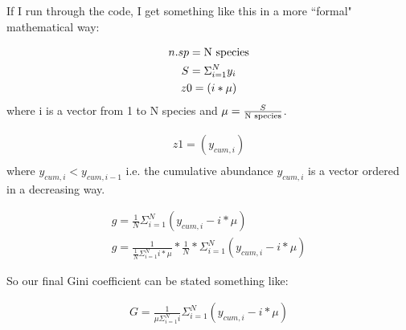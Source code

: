 \documentclass{article}
\begin{document}
If I run through the code, I get something like this in a more ``formal" mathematical way:

\begin{gather}
n.sp = \textnormal{N species} \\
S = \Sigma_{i=1}^Ny_i \\
z0 = (i * \mu )
\end{gather}
where i is a vector from 1 to N species and $ \mu = \frac{S}{\textnormal{N species}}$.

\begin{gather}
z1 = (y_{cum,i})\\
\end{gather}
where $ y_{cum,i} < y_{cum,i-1} $ i.e. the cumulative abundance $y_{cum,i}$ is a vector ordered in a decreasing way.

\begin{gather}
g = \frac{1}{N}\Sigma_{i=1}^N(y_{cum,i}-i*\mu) \\
g = \frac{1}{\frac{1}{N}\Sigma^N_{i=1}i*\mu}*\frac{1}{N}*\Sigma_{i=1}^N(y_{cum,i}-i*\mu)
\end{gather}

So our final Gini coefficient can be stated something like:

\begin{gather}
G = \frac{1}{\mu\Sigma_{i=1}^Ni}\Sigma_{i=1}^N(y_{cum,i} - i*\mu)
\end{gather}
\end{document}
